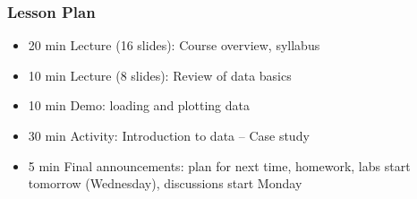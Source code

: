 \begin{frame}
    \frametitle{Lesson Plan}
    \begin{itemize}
        \item 20 min Lecture (16 slides): Course overview, syllabus
        \item 10 min Lecture (8 slides): Review of data basics
        \item 10 min Demo: loading and plotting data 
        \item 30 min Activity: Introduction to data -- Case study
        \item 5 min Final announcements: plan for next time, homework, labs start tomorrow (Wednesday), discussions start Monday
    \end{itemize}
\end{frame}
    


